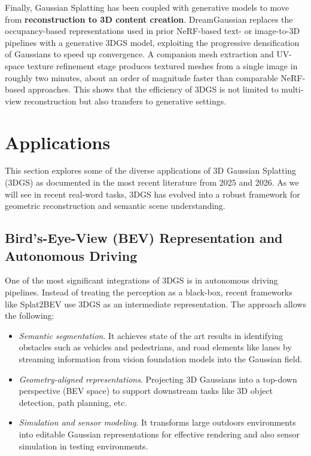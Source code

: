 \documentclass[
	a4paper, %
	10pt, %
	unnumberedsections, %
	twoside, %
]{LTJournalArticle}
\begin{document}
Finally, Gaussian Splatting has been coupled with generative models to move from \textbf{reconstruction to 3D content creation}. DreamGaussian \cite{tang2024dreamgaussian} replaces the occupancy-based representations used in prior NeRF-based text- or image-to-3D pipelines with a generative 3DGS model, exploiting the progressive densification of Gaussians to speed up convergence. A companion mesh extraction and UV-space texture refinement stage produces textured meshes from a single image in roughly two minutes, about an order of magnitude faster than comparable NeRF-based approaches. This shows that the efficiency of 3DGS is not limited to multi-view reconstruction but also transfers to generative settings.

\section{Applications}

This section explores some of the diverse applications of 3D Gaussian Splatting (3DGS) as documented in the most recent literature from 2025 and 2026. As we will see in recent real-word tasks, 3DGS has evolved into a robust framework for geometric reconstruction and semantic scene understanding.

\subsection{Bird's-Eye-View (BEV) Representation and Autonomous Driving}

One of the most significant integrations of 3DGS is in autonomous driving pipelines. Instead of treating the perception as a black-box, recent frameworks like Splat2BEV \cite{splat2bev} use 3DGS as an intermediate representation. The approach allows the following:
\begin{itemize}
	\item \textit{Semantic segmentation}. It achieves state of the art results in identifying obstacles such as vehicles and pedestrians, and road elements like lanes by streaming information from vision foundation models into the Gaussian field. 
	\item \textit{Geometry-aligned representations}. Projecting 3D Gaussians into a top-down perspective (BEV space) to support downstream tasks like 3D object detection, path planning, etc.
	\item \textit{Simulation and sensor modeling}. It transforms large outdoors environments into editable Gaussian representations for effective rendering and also sensor simulation in testing environments.
\end{itemize}
\end{document}
